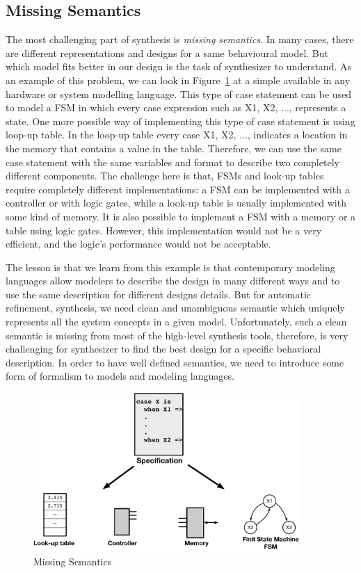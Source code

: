 \subsection{Missing Semantics}
\label{sec:missing_semantics}

The most challenging part of synthesis is \emph{missing semantics}.
In many cases, there are different representations and designs for a same behavioural model. 
But which model fits better in our design is the task of synthesizer to understand. 
As an example of this problem, we can look in Figure~\ref{fig:missing_semantics} at a simple  available in any hardware or system modelling language.
This type of case statement can be used to model a FSM in which every case expression such as X1, X2, ..., represents a state.
One more possible way of implementing this type of case statement is using loop-up table.
In the loop-up table every case X1, X2, ..., indicates a location in the memory that contains a value in the table.
Therefore,  we can use the same case statement with the same variables and format to describe two completely different components.
The challenge here is that, FSMs and look-up tables require completely different implementations:  a FSM can be implemented with a controller or with logic gates, while a look-up table is usually implemented with some kind of memory.
It is also possible to implement a FSM with a memory or a table using logic gates.
However, this implementation would not be a very efficient, and the logic's performance would not be acceptable.

The lesson is that we learn from this example is that contemporary modeling languages allow modelers to describe the design in many different ways and to use the same description for different designs details. But for automatic refinement, synthesis, we need clean and unambiguous semantic which uniquely represents all the system concepts in a given model.
Unfortunately, such a clean semantic is missing from most of the high-level synthesis tools, therefore, is very challenging for synthesizer to find the best design for a specific behavioral description.
In order to have well defined semantics, we need to introduce some form of formalism to models and modeling languages.


\begin{figure}[h]
    \centering
    \includegraphics[width=0.9\textwidth]{figures/Introduction/Missing_Semantics.pdf}
    \caption{Missing Semantics}
    \label{fig:missing_semantics}
\end{figure}


